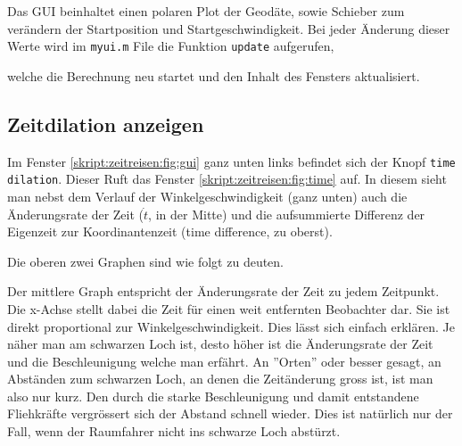 \begin{refsection}
    Das GUI beinhaltet einen polaren Plot der Geodäte, sowie Schieber zum verändern der Startposition und Startgeschwindigkeit. Bei jeder Änderung dieser Werte wird im \texttt{myui.m} File die Funktion \texttt{update} aufgerufen, 
      
    welche die Berechnung neu startet und den Inhalt des Fensters aktualisiert.
    
    \subsection{Zeitdilation anzeigen}
    Im Fenster \ref{skript:zeitreisen:fig:gui} ganz unten links befindet sich der Knopf \texttt{time dilation}. Dieser Ruft das Fenster \ref{skript:zeitreisen:fig:time} auf. In diesem sieht man nebst dem Verlauf der Winkelgeschwindigkeit (ganz unten) auch die Änderungsrate der Zeit ($\dot{t}$, in der Mitte) und die aufsummierte Differenz der Eigenzeit zur Koordinantenzeit (time difference, zu oberst).
    
    Die oberen zwei Graphen sind wie folgt zu deuten. 
    
    Der mittlere Graph entspricht der Änderungsrate der Zeit zu jedem Zeitpunkt. Die x-Achse stellt dabei die Zeit für einen weit entfernten Beobachter dar. Sie ist direkt proportional zur Winkelgeschwindigkeit. Dies lässt sich einfach erklären. Je näher man am schwarzen Loch ist, desto höher ist die Änderungsrate der Zeit und die Beschleunigung welche man erfährt. An ''Orten'' oder besser gesagt, an Abständen zum schwarzen Loch, an denen die Zeitänderung gross ist, ist man also nur kurz. Den durch die starke Beschleunigung und damit entstandene Fliehkräfte vergrössert sich der Abstand schnell wieder.
    Dies ist natürlich nur der Fall, wenn der Raumfahrer nicht ins schwarze Loch abstürzt.
    

\end{refsection}
